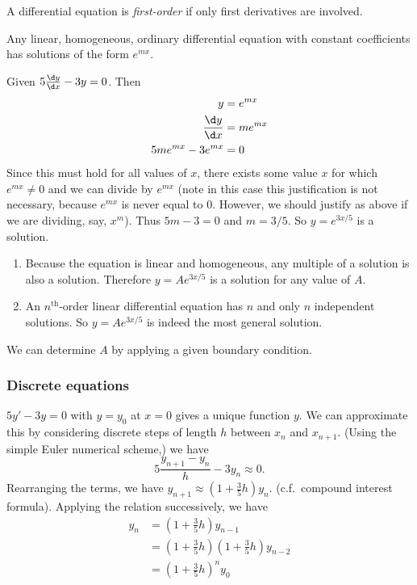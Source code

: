 \documentclass[a4paper]{article}
\begin{document}
\begin{defi}
  A differential equation is \emph{first-order} if only first derivatives are involved.
\end{defi}

\begin{thm}
  Any linear, homogeneous, ordinary differential equation with constant coefficients has solutions of the form $e^{mx}$.
\end{thm}
\begin{eg}
  Given $5\frac{\d y}{\d x} - 3y = 0$. Then 
  \begin{align*}
    y &= e^{mx}\\
    \frac{\d y}{\d x} &= me^{mx}\\
    5me^{mx} - 3e^{mx} &= 0
  \end{align*}
  Since this must hold for all values of $x$, there exists some value $x$ for which $e^{mx} \not= 0$ and we can divide by $e^{mx}$ (note in this case this justification is not necessary, because $e^{mx}$ is never equal to 0. However, we should justify as above if we are dividing, say, $x^m$). Thus $5m - 3 = 0$ and $m = 3/5$. So $y = e^{3x/5}$ is a solution. 
\end{eg}

\begin{enumerate}
\item Because the equation is linear and homogeneous, any multiple of a solution is also a solution. Therefore $y = Ae^{3x/5}$ is a solution for any value of $A$. 
\item An $n^\text{th}$-order linear differential equation has $n$ and only $n$ independent solutions. So $y = Ae^{3x/5}$ is indeed the most general solution.
\end{enumerate}
We can determine $A$ by applying a given boundary condition.

\subsubsection{Discrete equations}
$5y' - 3y = 0$ with $y = y_0$ at $x = 0$ gives a unique function $y$. We can approximate this by considering discrete steps of length $h$ between $x_n$ and $x_{n+1}$. (Using the simple Euler numerical scheme,) we have
\[
5\frac{y_{n+1} - y_n}{h} - 3y_n \approx 0.
\]
Rearranging the terms, we have $y_{n+1} \approx (1 + \frac{3}{5}h)y_n$. (c.f.\ compound interest formula). Applying the relation successively, we have 
\begin{align*}
  y_n &= \left(1 + \frac{3}{5}h\right)y_{n - 1}\\
  &= \left(1 + \frac{3}{5}h\right)\left(1 + \frac{3}{5}h\right)y_{n - 2}\\
  &= \left(1 + \frac{3}{5}h\right)^ny_0
\end{align*}
\end{document}
